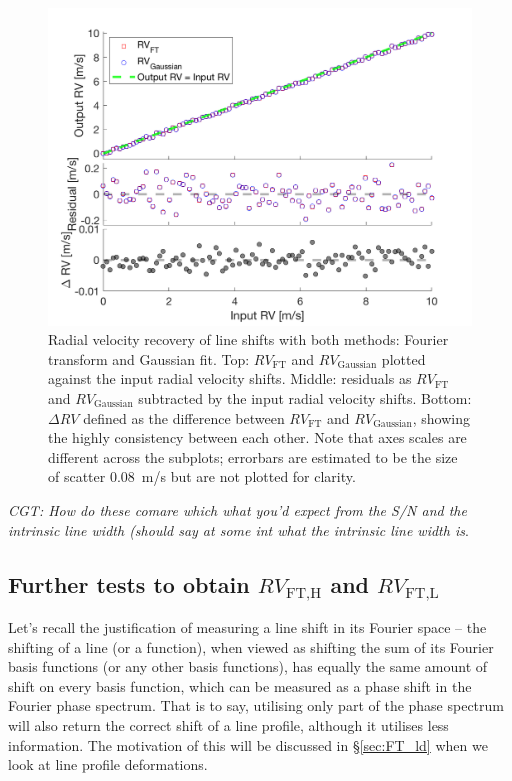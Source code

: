 \begin{figure}[tbp]
\centering
\includegraphics[width = 0.7 \linewidth]
{./Figures/Methods/5-LINE_SHIFT_ONLY.png}
\caption[Radial velocity recovery]
{Radial velocity recovery of line shifts with both methods: Fourier transform and Gaussian fit. Top: $RV_\text{FT}$ and $RV_\text{Gaussian}$ plotted against the input radial velocity shifts. Middle: residuals as $RV_\text{FT}$ and $RV_\text{Gaussian}$ subtracted by the input radial velocity shifts. Bottom: $\Delta RV$ defined as the difference between $RV_\text{FT}$ and $RV_\text{Gaussian}$, showing the highly consistency between each other. Note that axes scales are different across the subplots; errorbars are estimated to be the size of scatter 0.08~m/s but are not plotted for clarity.}
\label{fig:rv_recovery}
\end{figure} 
\FloatBarrier

{\em CGT: How do these comare which what you'd expect from the S/N and the intrinsic line width (should say at some int what the intrinsic line width is}.



\subsection{Further tests to obtain $RV_\text{FT,H}$ and $RV_\text{FT,L}$}
\label{sec:Further_tests}

Let's recall the justification of measuring a line shift in its Fourier space -- the shifting of a line (or a function), when viewed as shifting the sum of its Fourier basis functions (or any other basis functions), has equally the same amount of shift on every basis function, which can be measured as a phase shift in the Fourier phase spectrum. That is to say, utilising only part of the phase spectrum will also return the correct shift of a line profile, although it utilises less information. The motivation of this will be discussed in \S\ref{sec:FT_ld} when we look at line profile deformations. 

